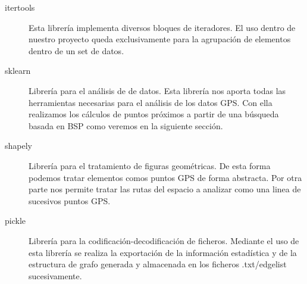 \begin{description}
\item[itertools] Esta librería implementa diversos bloques de iteradores. El uso dentro de nuestro proyecto queda exclusivamente para la agrupación de elementos dentro de un set de datos.
\item[sklearn] Librería para el análisis de de datos. Esta librería nos aporta todas las herramientas necesarias para el análisis de los datos \ac{GPS}. Con ella realizamos los cálculos de puntos próximos a partir de una búsqueda basada en \ac{BSP} como veremos en la siguiente sección.
\item[shapely] Librería para el tratamiento de figuras geométricas. De esta forma podemos tratar elementos comos puntos \ac{GPS} de forma abstracta. Por otra parte nos permite tratar las rutas del espacio a analizar como una linea de sucesivos puntos \ac{GPS}.
\item[pickle] Librería para la codificación-decodificación de ficheros. Mediante el uso de esta librería se realiza la exportación de la información estadística y de la estructura de grafo generada y almacenada en los ficheros .txt/edgelist sucesivamente.
\end{description}